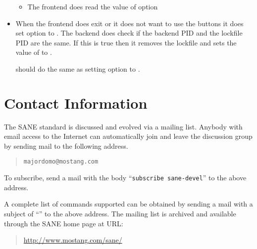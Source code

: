 \documentclass[11pt,DVIps]{report}
\begin{document}
\begin{changebar}
\begin{itemize}
\begin{itemize}
  \item
  The frontend does read the value of option 
  \end{itemize}

\item
When the frontend does exit or it does not want to use the buttons
it does set option  to .
The backend does check if the backend PID and the lockfile PID are
the same. If this is true then it removes the lockfile and sets the value 
of  to .

 should do the same as setting option
 to .

\end{itemize}
\end{changebar}





\chapter{Contact Information}\label{chap:contact}

The SANE standard is discussed and evolved via a mailing list.
Anybody with email access to the Internet can automatically join and
leave the discussion group by sending mail to the following address.
\begin{quote}
\begin{verbatim}
majordomo@mostang.com
\end{verbatim}
\end{quote}
To subscribe, send a mail with the body ``\verb|subscribe sane-devel|'' to the
above address.

A complete list of commands supported can be obtained by sending a
mail with a subject of ``'' to the above address.  The
mailing list is archived and available through the SANE home page at
URL:
\begin{quote}
\url{http://www.mostang.com/sane/}
\end{quote}

\newpage

\end{document}
